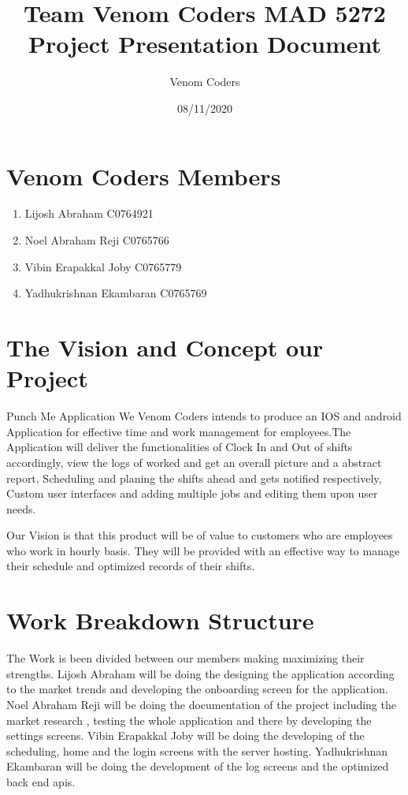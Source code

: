 \documentclass[16pt]{article}
\title{Team Venom Coders MAD 5272 Project Presentation Document}
\author{Venom Coders}
\date{ 08/11/2020}
\begin{document}
\maketitle




\section * {Venom Coders Members}

\begin{enumerate}

\item Lijosh Abraham C0764921 

\item Noel Abraham Reji C0765766
\item Vibin Erapakkal Joby C0765779 
\item Yadhukrishnan Ekambaran C0765769

\end{enumerate}




\section * {The Vision and Concept our Project}




Punch Me Application 
We Venom Coders intends to produce an IOS and android Application for effective time and work management for employees.The Application will deliver the functionalities of Clock In and Out of shifts accordingly, view the logs of worked and get an overall picture and a abstract report, Scheduling and planing the shifts ahead and gets notified respectively, Custom user interfaces and adding multiple jobs and editing them upon user needs.




Our Vision is that this product will be of value to customers who are employees who work in hourly basis. They will be provided with an effective way to manage their schedule and optimized records of their shifts.




\section * {Work Breakdown Structure}
The Work is been divided between our members making maximizing their strengths.
Lijosh Abraham will be doing the designing the application according to the market trends and developing the onboarding screen for the application.
Noel Abraham Reji will be doing the documentation of the project including the market research , testing the whole application and there by developing the settings screens.
Vibin Erapakkal Joby will be doing the developing of the scheduling, home and the login screens with the server hosting.
Yadhukrishnan Ekambaran will be doing  the development of the log screens and the optimized back end apis.
\end{document}
